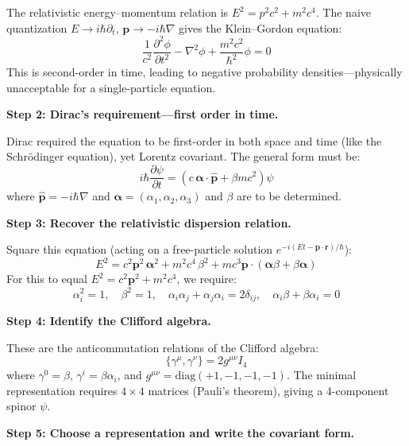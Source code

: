 \documentclass[11pt,openright]{book}
\begin{document}
The relativistic energy--momentum relation is $E^2 = p^2c^2 + m^2c^4$. The naive quantization $E \to i\hbar\partial_t$, $\mathbf{p} \to -i\hbar\nabla$ gives the Klein--Gordon equation:
\begin{equation}
\frac{1}{c^2}\frac{\partial^2 \phi}{\partial t^2} - \nabla^2 \phi + \frac{m^2c^2}{\hbar^2}\phi = 0
\end{equation}
This is second-order in time, leading to negative probability densities---physically unacceptable for a single-particle equation.

\textbf{Step 2: Dirac's requirement---first order in time.}

Dirac required the equation to be first-order in both space and time (like the Schr\"odinger equation), yet Lorentz covariant. The general form must be:
\begin{equation}
i\hbar\frac{\partial \psi}{\partial t} = \left(c\,\boldsymbol{\alpha} \cdot \hat{\mathbf{p}} + \beta m c^2\right)\psi
\end{equation}
where $\hat{\mathbf{p}} = -i\hbar\nabla$ and $\boldsymbol{\alpha} = (\alpha_1, \alpha_2, \alpha_3)$ and $\beta$ are to be determined.

\textbf{Step 3: Recover the relativistic dispersion relation.}

Square this equation (acting on a free-particle solution $e^{-i(Et - \mathbf{p}\cdot\mathbf{r})/\hbar}$):
\begin{equation}
E^2 = c^2\mathbf{p}^2\,\boldsymbol{\alpha}^2 + m^2c^4\,\beta^2 + mc^3\mathbf{p}\cdot(\boldsymbol{\alpha}\beta + \beta\boldsymbol{\alpha})
\end{equation}
For this to equal $E^2 = c^2\mathbf{p}^2 + m^2c^4$, we require:
\begin{equation}
\alpha_i^2 = 1,\quad \beta^2 = 1,\quad \alpha_i\alpha_j + \alpha_j\alpha_i = 2\delta_{ij},\quad \alpha_i\beta + \beta\alpha_i = 0
\end{equation}

\textbf{Step 4: Identify the Clifford algebra.}

These are the anticommutation relations of the Clifford algebra:
\begin{equation}
\{\gamma^\mu, \gamma^\nu\} = 2g^{\mu\nu}I_4
\end{equation}
where $\gamma^0 = \beta$, $\gamma^i = \beta\alpha_i$, and $g^{\mu\nu} = \text{diag}(+1,-1,-1,-1)$. The minimal representation requires $4\times 4$ matrices (Pauli's theorem), giving a 4-component spinor $\psi$.

\textbf{Step 5: Choose a representation and write the covariant form.}
\end{document}
